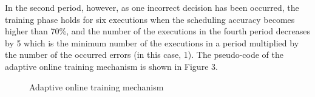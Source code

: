 \documentclass[10pt, conference, compsocconf]{IEEEtran}
\begin{document}
{%
In the second period, however, as one incorrect decision has been
occurred, the training phase holds for six executions when the
scheduling accuracy becomes higher than 70\%, and the number of the
executions in the fourth period decreases by 5 which is the minimum
number of the executions in a period multiplied by the number of the
occurred errors (in this case, 1). 
%
The pseudo-code of the adaptive online training mechanism is shown in
Figure 3.
%
\begin{figure}
\begin{algorithmic}[1]
	\ELSE
		\ELSE
		\ENDIF
	\ENDIF
\ENDWHILE
\STATE
{}
\ELSE
\ENDIF
\end{algorithmic}
\caption{Adaptive online training mechanism}
\end{figure}
%
}
\end{document}
